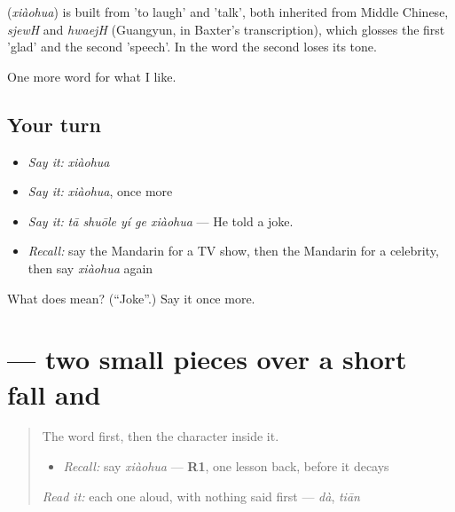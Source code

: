 \begin{cousinweb}
\textbf{} (\emph{xiàohua}) is built from  'to laugh' and  'talk', both inherited from Middle Chinese, \emph{sjewH} and \emph{hwaejH} (Guangyun, in Baxter's transcription), which glosses the first 'glad' and the second 'speech'. In the word the second loses its tone.
\end{cousinweb}

\begin{grammarlens}[title={What you've built}]
One more word for what I like.
\end{grammarlens}

\subsection*{Your turn}
\begin{itemize}
\raggedright
  \item \emph{Say it:} \emph{xiàohua}
  \item \emph{Say it:} \emph{xiàohua}, once more
  \item \emph{Say it:} \emph{tā shuōle yí ge xiàohua} — He told a joke.
  \item \emph{Recall:} say the Mandarin for a TV show, then the Mandarin for a celebrity, then say \emph{xiàohua} again
\end{itemize}

\begin{tcolorbox}[breakable,colback=teal!4,colframe=teal!35!black,title={Before you move on}]
What does  mean? (\textquotedblleft{}Joke\textquotedblright{}.) Say it once more.
\end{tcolorbox}
\section[\texorpdfstring{\zh{笑} (xiào)}{笑 (xiào)}]{ — two small pieces over a short fall and }

\label{lesson:ZH-W267-xiao-laugh}



\begin{quote}
The word first, then the character inside it.

\begin{itemize}
\raggedright
  \item \emph{Recall:} say \emph{xiàohua} — \textbf{R1}, one lesson back, before it decays
\end{itemize}

\begin{quote}
 
\end{quote}

\emph{Read it:} each one aloud, with nothing said first — \emph{dà}, \emph{tiān}
\end{quote}

